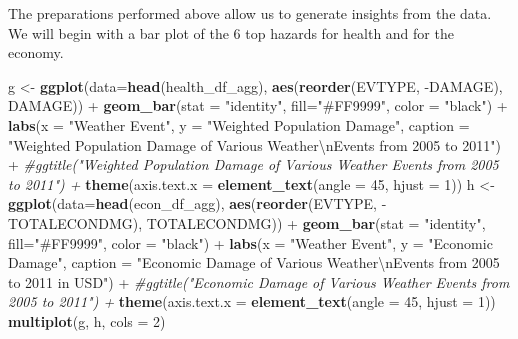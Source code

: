 \documentclass[]{article}
\newenvironment{Shaded}{\begin{snugshade}}{\end{snugshade}}
\newcommand{\KeywordTok}[1]{\textcolor[rgb]{0.13,0.29,0.53}{\textbf{{#1}}}}
\newcommand{\DataTypeTok}[1]{\textcolor[rgb]{0.13,0.29,0.53}{{#1}}}
\newcommand{\DecValTok}[1]{\textcolor[rgb]{0.00,0.00,0.81}{{#1}}}
\newcommand{\CharTok}[1]{\textcolor[rgb]{0.31,0.60,0.02}{{#1}}}
\newcommand{\StringTok}[1]{\textcolor[rgb]{0.31,0.60,0.02}{{#1}}}
\newcommand{\CommentTok}[1]{\textcolor[rgb]{0.56,0.35,0.01}{\textit{{#1}}}}
\newcommand{\NormalTok}[1]{{#1}}
\begin{document}
The preparations performed above allow us to generate insights from the
data. We will begin with a bar plot of the 6 top hazards for health and
for the economy.

\begin{Shaded}
\begin{Highlighting}[]
\NormalTok{g <-}\StringTok{ }\KeywordTok{ggplot}\NormalTok{(}\DataTypeTok{data=}\KeywordTok{head}\NormalTok{(health_df_agg), }\KeywordTok{aes}\NormalTok{(}\KeywordTok{reorder}\NormalTok{(EVTYPE, -DAMAGE), DAMAGE)) +}
\StringTok{  }\KeywordTok{geom_bar}\NormalTok{(}\DataTypeTok{stat =} \StringTok{"identity"}\NormalTok{, }\DataTypeTok{fill=}\StringTok{"#FF9999"}\NormalTok{, }\DataTypeTok{color =} \StringTok{"black"}\NormalTok{) +}\StringTok{ }
\StringTok{  }\KeywordTok{labs}\NormalTok{(}\DataTypeTok{x =} \StringTok{"Weather Event"}\NormalTok{, }\DataTypeTok{y =} \StringTok{"Weighted Population Damage"}\NormalTok{,}
       \DataTypeTok{caption =} \StringTok{"Weighted Population Damage of Various Weather}\CharTok{\textbackslash{}n}\StringTok{Events from 2005 to 2011"}\NormalTok{) +}\StringTok{ }
\StringTok{  }\CommentTok{#ggtitle("Weighted Population Damage of Various Weather Events from 2005 to 2011") + }
\StringTok{  }\KeywordTok{theme}\NormalTok{(}\DataTypeTok{axis.text.x =} \KeywordTok{element_text}\NormalTok{(}\DataTypeTok{angle =} \DecValTok{45}\NormalTok{, }\DataTypeTok{hjust =} \DecValTok{1}\NormalTok{))}
\NormalTok{h <-}\StringTok{ }\KeywordTok{ggplot}\NormalTok{(}\DataTypeTok{data=}\KeywordTok{head}\NormalTok{(econ_df_agg), }\KeywordTok{aes}\NormalTok{(}\KeywordTok{reorder}\NormalTok{(EVTYPE, -TOTALECONDMG), TOTALECONDMG)) +}
\StringTok{  }\KeywordTok{geom_bar}\NormalTok{(}\DataTypeTok{stat =} \StringTok{"identity"}\NormalTok{, }\DataTypeTok{fill=}\StringTok{"#FF9999"}\NormalTok{, }\DataTypeTok{color =} \StringTok{"black"}\NormalTok{) +}\StringTok{ }
\StringTok{  }\KeywordTok{labs}\NormalTok{(}\DataTypeTok{x =} \StringTok{"Weather Event"}\NormalTok{, }\DataTypeTok{y =} \StringTok{"Economic Damage"}\NormalTok{,}
       \DataTypeTok{caption =} \StringTok{"Economic Damage of Various Weather}\CharTok{\textbackslash{}n}\StringTok{Events from 2005 to 2011 in USD"}\NormalTok{) +}\StringTok{ }
\StringTok{  }\CommentTok{#ggtitle("Economic Damage of Various Weather Events from 2005 to 2011") + }
\StringTok{  }\KeywordTok{theme}\NormalTok{(}\DataTypeTok{axis.text.x =} \KeywordTok{element_text}\NormalTok{(}\DataTypeTok{angle =} \DecValTok{45}\NormalTok{, }\DataTypeTok{hjust =} \DecValTok{1}\NormalTok{))}
\KeywordTok{multiplot}\NormalTok{(g, h, }\DataTypeTok{cols =} \DecValTok{2}\NormalTok{)}
\end{Highlighting}
\end{Shaded}
\end{document}
